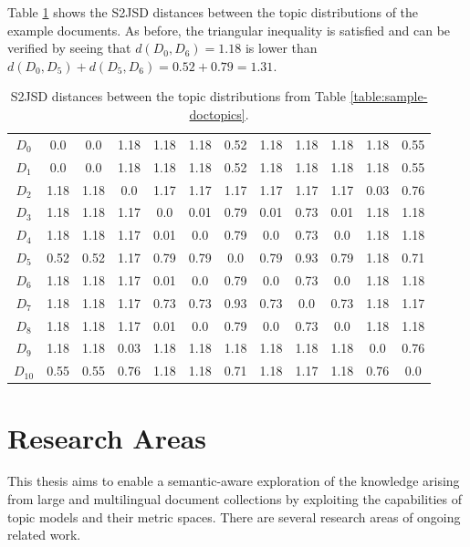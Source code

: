 Table \ref{table:s2jsd-distances} shows the S2JSD distances between the topic distributions of the example documents. As before, the triangular inequality is satisfied and can be verified by seeing that $d(D_0,D_6)=1.18$ is lower than $d(D_0,D_5)+d(D_5,D_6)=0.52+0.79=1.31$. 


\begin{table}[!htbp]
\centering%
\small
\begin{tabularx}{\linewidth}{CCCCCCCCCCCC}
\toprule
\heading{} &  &  &  &  &  &  &  &  &  &  &  \\
\midrule
\midrule
$D_0$&0.0&0.0&1.18&1.18&1.18&0.52&1.18&1.18&1.18&1.18&0.55\\
\midrule
$D_1$&0.0&0.0&1.18&1.18&1.18&0.52&1.18&1.18&1.18&1.18&0.55\\
\midrule
$D_2$&1.18&1.18&0.0&1.17&1.17&1.17&1.17&1.17&1.17&0.03&0.76\\
\midrule
$D_3$&1.18&1.18&1.17&0.0&0.01&0.79&0.01&0.73&0.01&1.18&1.18\\
\midrule
$D_4$&1.18&1.18&1.17&0.01&0.0&0.79&0.0&0.73&0.0&1.18&1.18\\
\midrule
$D_5$&0.52&0.52&1.17&0.79&0.79&0.0&0.79&0.93&0.79&1.18&0.71\\
\midrule
$D_6$&1.18&1.18&1.17&0.01&0.0&0.79&0.0&0.73&0.0&1.18&1.18\\
\midrule
$D_7$&1.18&1.18&1.17&0.73&0.73&0.93&0.73&0.0&0.73&1.18&1.17\\
\midrule
$D_8$&1.18&1.18&1.17&0.01&0.0&0.79&0.0&0.73&0.0&1.18&1.18\\
\midrule
$D_9$&1.18&1.18&0.03&1.18&1.18&1.18&1.18&1.18&1.18&0.0&0.76\\
\midrule
$D_{10}$&0.55&0.55&0.76&1.18&1.18&0.71&1.18&1.17&1.18&0.76&0.0\\
\midrule
\bottomrule
\end{tabularx}
\caption{S2JSD distances between the topic distributions from Table \ref{table:sample-doctopics}.}
\label{table:s2jsd-distances}
\end{table}


\section{Research Areas}
\label{sec:research-topic}

This thesis aims to enable a semantic-aware exploration of the knowledge arising from large and multilingual document collections by exploiting the capabilities of topic models and their metric spaces. There are several research areas of ongoing related work. 

